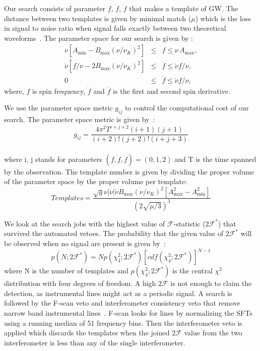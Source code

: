 \documentclass{ttuthes2007}
\begin{document}
Our search consists of parameter $f$, $\dot{f}$, $\ddot{f}$ that makes a
template of \ac{GW}. The distance between two templates is given by minimal
match ($\mu$) which is the loss in signal to noise ratio when signal falls
exactly between two theoretical waveforms~\cite{Owen:1995tm}.  
The parameter space for our search is given by \citet{PhysRevD.100.064013}:
\begin{eqnarray}
\nu \left[ A_{\min} - B_{\max} \left( \nu/\nu_K \right)^2 \right] & \le & f
\le \nu\, A_{\max},
\\
\dot\nu \left[ f/\nu - 2B_{\max} \left( \nu/\nu_K \right)^2 \right] & \le &
\dot f \le \dot\nu f/\nu,
\\
0 & \le & \ddot f \le \ddot\nu f/\nu,
\end{eqnarray}
where, $f$ is spin frequency, $\dot{f}$ and $\ddot{f}$ is the first and second
spin derivative.

We use the parameter space metric $g_{ij}$ to control the computational
cost of our search. 
The parameter space metric is given by~\cite{Wette:2008hg,Owen:1995tm}:
\begin{equation}
g_{ij}=\frac{4\pi^2T^{i+j+2}(i+1)(j+1)}{(i+2)!(j+2)!(i+j+3)}
\end{equation}\\
where i, j stands for parameters $(f,\dot{f},\ddot{f})=(0,1,2)$ and T is the time spanned by the observation. 
The template number is given by dividing the proper volume of the parameter
space by the proper volume per template:~\cite{PhysRevD.100.064013}
\begin{equation}\label{templatescalc}
Templates = \frac{\sqrt{g} \nu \left| \dot\nu \right| \ddot\nu B_{\max} \left(
\nu/\nu_K
\right)^2 \left[ A_{\max}^2 - A_{\min}^2 \right]}{\left( 2 \sqrt{\mu/3}
\right)^3}
\end{equation}

We look at the search jobs with the highest value of $\mathcal{F}$-statistic
($2\mathcal{F}^*$) that survived the automated vetoes. The probability that the
given value of $2\mathcal{F}^*$ will be observed when no signal are present is
given by~\cite{Abadie_2010}: 
\begin{equation} 
p(N;2\mathcal{F}^*)= Np(\chi^2_4;2\mathcal{F}^*)[cdf(\chi^2_4;2\mathcal{F}^*)]^{N-1} 
\end{equation} 
where N is the number of templates and $p(\chi^2_4;2\mathcal{F}^*)$ is the
central $\chi^2$ distribution with four degrees of freedom.  A high
$2\mathcal{F}$ is not enough to claim the detection, as instrumental lines might
act as a periodic signal. A search is followed by the F-scan veto and
interferometer consistency veto that remove narrow band instrumental
lines~\cite{Lindblom_2020}. F-scan looks for lines by normalizing the
\acp{SFT}  using a running median of 51 frequency bins.  Then the interferometer
veto is applied which discards the templates when the joined $2\mathcal{F}$
value from the two interferometer is less than any of the single interferometer.
\end{document}
